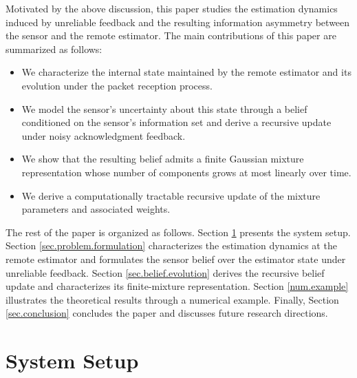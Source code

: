 \documentclass[letterpaper, 10 pt, conference]{ieeeconf}
\begin{document}
Motivated by the above discussion, this paper studies the estimation dynamics induced by unreliable feedback and the resulting information asymmetry between the sensor and the remote estimator. The main contributions of this paper are summarized as follows:
\begin{itemize}
    \item We characterize the internal state maintained by the remote estimator and its evolution under the packet reception process.
    \item We  model the sensor’s uncertainty about this state through a belief conditioned on the sensor’s information set and derive a recursive update  under noisy acknowledgment feedback.
    \item   We show that the resulting belief admits a finite Gaussian mixture representation whose number of components grows at most linearly over time.
    \item We derive a computationally tractable recursive update of the mixture parameters and associated weights.
\end{itemize}


The rest of the paper is organized as follows. Section \ref{sec:system_setup} presents the system setup. Section \ref{sec.problem.formulation} characterizes the estimation dynamics at the remote estimator and formulates the sensor belief over the estimator state under unreliable feedback. Section \ref{sec.belief.evolution} derives the recursive belief update and characterizes its finite-mixture representation. Section \ref{num.example} illustrates the theoretical results through a numerical example. Finally, Section \ref{sec.conclusion} concludes the paper and discusses future research directions.





\section{System Setup}
\label{sec:system_setup}
\end{document}
